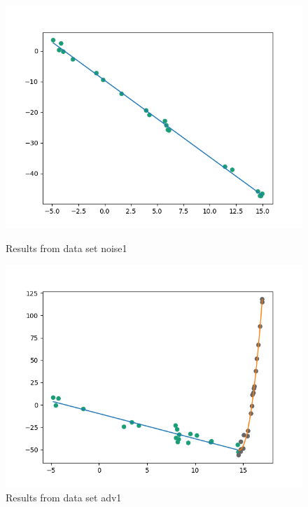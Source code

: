\documentclass[]{article}
\begin{document}
  \begin{figure}[!hbt]
    \centering
    \begin{minipage}[b]{0.45\textwidth}
      \includegraphics[width=\textwidth]{noise.png}
      \centering
      \caption {Results from data set noise1}
      \label{fig:noise1}
    \end{minipage}
    \hfill
    \begin{minipage}[b]{0.45\textwidth}
      \includegraphics[width=\textwidth]{noise2.png}
      \caption {Results from data set adv1}
      \label{fig:noise2}
    \end{minipage}

  \end{figure}
\end{document}
